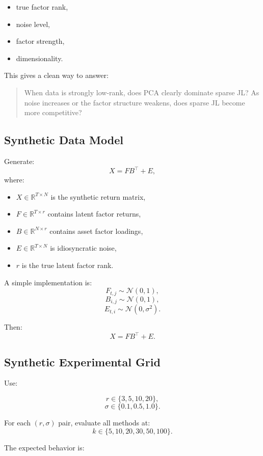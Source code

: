 \documentclass[11pt]{article}
\begin{document}
\begin{itemize}
    \item true factor rank,
    \item noise level,
    \item factor strength,
    \item dimensionality.
\end{itemize}

This gives a clean way to answer:

\begin{quote}
When data is strongly low-rank, does PCA clearly dominate sparse JL? As noise increases or the factor structure weakens, does sparse JL become more competitive?
\end{quote}

\subsection{Synthetic Data Model}

Generate:
\[
X = F B^\top + E,
\]
where:

\begin{itemize}
    \item $X \in \mathbb{R}^{T \times N}$ is the synthetic return matrix,
    \item $F \in \mathbb{R}^{T \times r}$ contains latent factor returns,
    \item $B \in \mathbb{R}^{N \times r}$ contains asset factor loadings,
    \item $E \in \mathbb{R}^{T \times N}$ is idiosyncratic noise,
    \item $r$ is the true latent factor rank.
\end{itemize}

A simple implementation is:
\[
F_{t,j} \sim \mathcal{N}(0,1),
\]
\[
B_{i,j} \sim \mathcal{N}(0,1),
\]
\[
E_{t,i} \sim \mathcal{N}(0,\sigma^2).
\]

Then:
\[
X = F B^\top + E.
\]

\subsection{Synthetic Experimental Grid}

Use:

\[
r \in \{3, 5, 10, 20\},
\]
\[
\sigma \in \{0.1, 0.5, 1.0\}.
\]

For each $(r,\sigma)$ pair, evaluate all methods at:
\[
k \in \{5, 10, 20, 30, 50, 100\}.
\]

The expected behavior is:
\end{document}
